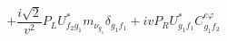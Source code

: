 %
\begin{dmath*}
%
  +  \frac{i \sqrt{2}}{v^2}P_L U_{f_2 g_1}^* m_{\nu_{g_1}} \delta_{g_1 f_1}  +  i vP_R U_{g_1 f_1}^* C^{e \varphi  }_{g_1 f_2}
%
\end{dmath*}
%
